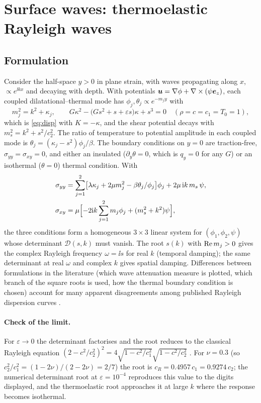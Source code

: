 \section{Surface waves: thermoelastic Rayleigh waves}\label{sec:surface}
\subsection{Formulation}
Consider the half-space $y>0$ in plane strain, with waves propagating along $x$, $\propto e^{\ii kx}$ and decaying with depth. With potentials $\bm u=\nabla\phi+\nabla\times(\psi\bm e_z)$, each coupled dilatational--thermal mode has $\phi_j,\theta_j\propto e^{-m_jy}$ with
\begin{equation}
m_j^2=k^2+\kappa_j,\qquad G\kappa^2-\bigl(Gs^2+s+\varepsilon s\bigr)\kappa+s^3=0\quad(\rho=c=c_1=T_0=1),
\end{equation}
which is \eqref{eq:disp} with $K=-\kappa$, and the shear potential decays with $m_s^2=k^2+s^2/c_2^2$. The ratio of temperature to potential amplitude in each coupled mode is $\theta_j=(\kappa_j-s^2)\phi_j/\beta$. The boundary conditions on $y=0$ are traction-free, $\sigma_{yy}=\sigma_{xy}=0$, and either an insulated ($\partial_y\theta=0$, which is $q_y=0$ for any $G$) or an isothermal ($\theta=0$) thermal condition. With
\begin{align}
\sigma_{yy}&=\sum_{j=1}^2\bigl[\lambda\kappa_j+2\mu m_j^2-\beta\theta_j/\phi_j\bigr]\phi_j+2\mu\,\mathrm i k\,m_s\,\psi,\\
\sigma_{xy}&=\mu\Bigl[-2\mathrm i k\sum_{j=1}^2m_j\phi_j+(m_s^2+k^2)\psi\Bigr],
\end{align}
the three conditions form a homogeneous $3\times3$ linear system for $(\phi_1,\phi_2,\psi)$ whose determinant $\mathcal D(s,k)$ must vanish. The root $s(k)$ with $\operatorname{Re} m_j>0$ gives the complex Rayleigh frequency $\omega=\ii s$ for real $k$ (temporal damping); the same determinant at real $\omega$ and complex $k$ gives spatial damping. Differences between formulations in the literature (which wave attenuation measure is plotted, which branch of the square roots is used, how the thermal boundary condition is chosen) account for many apparent disagreements among published Rayleigh dispersion curves \citep{Biswas2020a,Tung2019,Gupta2024,Aldandani2026,Abouelregal2011,Biswas2020c,Chirita2012,Singh2013,Singh2015}.

\paragraph{Check of the limit.} For $\varepsilon\to0$ the determinant factorises and the root reduces to the classical Rayleigh equation $(2-c^2/c_2^2)^2=4\sqrt{1-c^2/c_1^2}\sqrt{1-c^2/c_2^2}$ \citep{Rayleigh1885}. For $\nu=0.3$ (so $c_2^2/c_1^2=(1-2\nu)/(2-2\nu)=2/7$) the root is $c_R=0.4957\,c_1=0.9274\,c_2$; the numerical determinant root at $\varepsilon=10^{-4}$ reproduces this value to the digits displayed, and the thermoelastic root approaches it at large $k$ where the response becomes isothermal.

